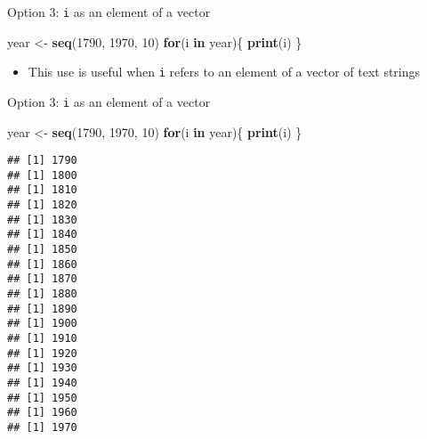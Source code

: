 \documentclass[ignorenonframetext,]{beamer}
\newenvironment{Shaded}{\begin{snugshade}}{\end{snugshade}}
\newcommand{\KeywordTok}[1]{\textcolor[rgb]{0.13,0.29,0.53}{\textbf{#1}}}
\newcommand{\DecValTok}[1]{\textcolor[rgb]{0.00,0.00,0.81}{#1}}
\newcommand{\StringTok}[1]{\textcolor[rgb]{0.31,0.60,0.02}{#1}}
\newcommand{\ControlFlowTok}[1]{\textcolor[rgb]{0.13,0.29,0.53}{\textbf{#1}}}
\newcommand{\NormalTok}[1]{#1}
\providecommand{\tightlist}{%
	\setlength{\itemsep}{0pt}\setlength{\parskip}{0pt}}
\begin{document}
\begin{frame}[fragile]{Option 3: \texttt{i} as an element of a vector}

\begin{Shaded}
\begin{Highlighting}[]
\NormalTok{year <-}\StringTok{ }\KeywordTok{seq}\NormalTok{(}\DecValTok{1790}\NormalTok{, }\DecValTok{1970}\NormalTok{, }\DecValTok{10}\NormalTok{)}
\ControlFlowTok{for}\NormalTok{(i }\ControlFlowTok{in}\NormalTok{ year)\{}
  \KeywordTok{print}\NormalTok{(i)}
\NormalTok{\}}
\end{Highlighting}
\end{Shaded}

\begin{itemize}
\tightlist
\item
  This use is useful when \texttt{i} refers to an element of a vector of
  text strings
\end{itemize}

\end{frame}

\begin{frame}[fragile]{Option 3: \texttt{i} as an element of a vector}

\begin{Shaded}
\begin{Highlighting}[]
\NormalTok{year <-}\StringTok{ }\KeywordTok{seq}\NormalTok{(}\DecValTok{1790}\NormalTok{, }\DecValTok{1970}\NormalTok{, }\DecValTok{10}\NormalTok{)}
\ControlFlowTok{for}\NormalTok{(i }\ControlFlowTok{in}\NormalTok{ year)\{}
  \KeywordTok{print}\NormalTok{(i)}
\NormalTok{\}}
\end{Highlighting}
\end{Shaded}

\begin{verbatim}
## [1] 1790
## [1] 1800
## [1] 1810
## [1] 1820
## [1] 1830
## [1] 1840
## [1] 1850
## [1] 1860
## [1] 1870
## [1] 1880
## [1] 1890
## [1] 1900
## [1] 1910
## [1] 1920
## [1] 1930
## [1] 1940
## [1] 1950
## [1] 1960
## [1] 1970
\end{verbatim}

\end{frame}
\end{document}
